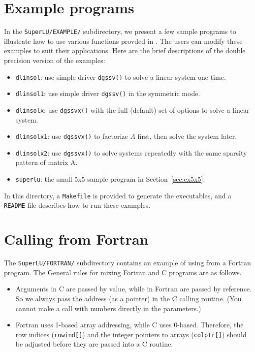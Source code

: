\section{Example programs}
\label{sec:example}

In the {\tt SuperLU/EXAMPLE/} subdirectory, we present a few sample
programs to illustrate how to use various functions provded in {\superlu}.
The users can modify these examples to suit their applications.
Here are the brief descriptions of the double precision version of
the examples:
\begin{itemize}
\item {\tt dlinsol}: use simple driver {\tt dgssv()} to solve a linear
      system one time.
\item {\tt dlinsol1}: use simple driver {\tt dgssv()} in the symmetric mode.
\item {\tt dlinsolx}: use {\tt dgssvx()} with the full (default) set of options
      to solve a linear system.
\item {\tt dlinsolx1}: use {\tt dgssvx()} to factorize $A$ first, then solve
      the system later.
\item {\tt dlinsolx2}: use {\tt dgssvx()} to solve systems repeatedly with
      the same sparsity pattern of matrix A.
\item {\tt superlu}: the small 5x5 sample program in Section~\ref{sec:ex5x5}.
\end{itemize}

In this directory, a {\tt Makefile} is provided to generate the executables,
and a {\tt README} file describes how to run these examples.


\section{Calling from Fortran}

The {\tt SuperLU/FORTRAN/} subdirectory contains an example of using
{\superlu} from a Fortran program.
The General rules for mixing Fortran and C programs are as follows.

\begin{itemize}
\item Arguments in C are passed by value, while in Fortran are passed by
      reference.  So we always pass the address (as a pointer) in the C 
      calling routine. (You cannot make a call with numbers directly in 
      the parameters.)
\item Fortran uses 1-based array addressing, while C uses 0-based.
      Therefore, the row indices ({\tt rowind[]}) and the integer pointers
      to arrays ({\tt colptr[]}) should be adjusted before they 
      are passed into a C routine.
\end{itemize}

